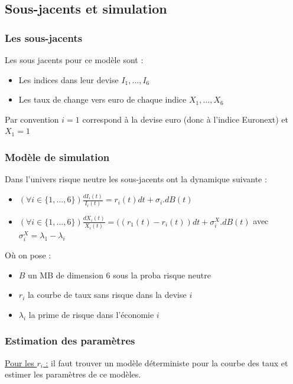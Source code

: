 \documentclass[a4paper,12pt]{article}
\begin{document}
\subsection{Sous-jacents et simulation}
\subsubsection{Les sous-jacents}
Les sous jacents pour ce modèle sont : 
\begin{itemize}[label=$\star$]
\item Les indices dans leur devise $I_1,\ldots,I_6$
\item Les taux de change vers euro de chaque indice $X_1,\ldots,X_6$
\end{itemize}
Par convention $i=1$ correspond à la devise euro (donc à l'indice Euronext) et $X_1=1$
\subsubsection{Modèle de simulation}
Dans l'univers risque neutre les sous-jacents ont la dynamique suivante : 
\begin{itemize}[label=$\star$]
\item $\left(\forall i\in\{1,\ldots,6\}\right) \frac{dI_i(t)}{I_i(t)}=r_i(t)dt + \sigma_i.dB(t)$
\item $\left(\forall i\in\{1,\ldots,6\}\right) \frac{dX_i(t)}{X_i(t)}=((r_1(t)-r_i(t))dt+\sigma^X_i.dB(t)$ avec $\sigma^X_i= \lambda_1-\lambda_i$
\end{itemize}
Où on pose : 
\begin{itemize}[label=$\bullet$]
\item $B$ un MB de dimension $6$ sous la proba risque neutre
\item $r_i$ la courbe de taux sans risque dans la devise $i$
\item $\lambda_i$ la prime de risque dans l'économie $i$
\end{itemize}
\subsubsection{Estimation des paramètres}
\underline{Pour les $r_i$ :} il faut trouver un modèle déterministe pour la courbe des taux et estimer les paramètres de ce modèles. \\
\end{document}
